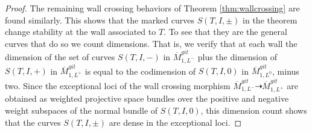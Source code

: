\documentclass{amsart}
\numberwithin{equation}{section}
\theoremstyle{definition}
\begin{document}
\begin{proof}
     The remaining wall crossing behaviors of Theorem \ref{thm:wallcrossing} are found similarly. This shows that the marked curves $S(T,I, \pm)$ in the theorem change stability at the wall associated to $T$. To see that they are the general curves that do so we count dimensions. That is, we verify that at each wall the dimension of the set of curves $S(T,I,-)$ in $\overline{M}^{git}_{1,L^-}$ plus the dimension of $S(T,I,+)$ in $\overline{M}^{git}_{1,L^+}$ is equal to the codimension of $S(T,I,0) $ in  $\overline{M}^{git}_{1,L^0}$, minus two. Since the exceptional loci of the wall crossing morphism $\overline{M}^{git}_{1,L^-} \dashrightarrow \overline{M}^{git}_{1,L^+}$ are obtained as weighted projective space bundles over the positive and negative weight subspaces of the normal bundle of $S(T,I,0) $, this dimension count shows that the curves $S(T,I, \pm)$ are dense in the exceptional loci.
        
    
    



\end{proof}
\end{document}
